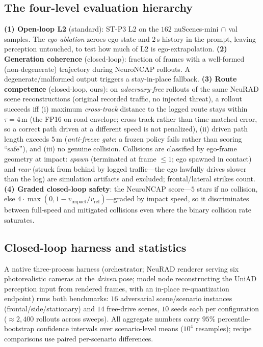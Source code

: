 \documentclass[conference]{IEEEtran}
\begin{document}
\subsection{The four-level evaluation hierarchy}
\label{sec:hierarchy-def}
\textbf{(1) Open-loop L2} (standard): ST-P3 L2 on the $162$ nuScenes-mini$\,\cap\,$val
samples. The \emph{ego-ablation} zeroes ego-state and $2$\,s history in the prompt, leaving
perception untouched, to test how much of L2 is ego-extrapolation.
\textbf{(2) Generation coherence} (closed-loop): fraction of frames with a well-formed
(non-degenerate) trajectory during NeuroNCAP rollouts. A degenerate/malformed output triggers
a stay-in-place fallback.
\textbf{(3) Route competence} (closed-loop, ours): on \emph{adversary-free} rollouts of the
same NeuRAD scene reconstructions (original recorded traffic, no injected threat), a rollout
succeeds iff (i) maximum \emph{cross-track} distance to the logged route stays within
$\tau{=}4$\,m (the FP16 on-road envelope; cross-track rather than time-matched error, so a
correct path driven at a different speed is not penalized), (ii) driven path length exceeds
$5$\,m (\emph{anti-freeze gate}: a frozen policy fails rather than scoring ``safe''), and
(iii) no genuine collision. Collisions are classified by ego-frame geometry at impact:
\emph{spawn} (terminated at frame $\le1$; ego spawned in contact) and \emph{rear} (struck
from behind by logged traffic---the ego lawfully drives slower than the log) are simulation
artifacts and excluded; frontal/lateral strikes count.
\textbf{(4) Graded closed-loop safety}: the NeuroNCAP score---$5$ stars if no collision, else
$4\!\cdot\!\max(0,1-v_\text{impact}/v_\text{ref})$---graded by impact speed, so it
discriminates between full-speed and mitigated collisions even where the binary collision
rate saturates.

\subsection{Closed-loop harness and statistics}
A native three-process harness (orchestrator; NeuRAD renderer serving six photorealistic
cameras at the \emph{driven} pose; model node reconstructing the UniAD perception input from
rendered frames, with an in-place re-quantization endpoint) runs both benchmarks:
$16$ adversarial scene/scenario instances (frontal/side/stationary) and $14$ free-drive
scenes, $10$ seeds each per configuration ($\approx2{,}400$ rollouts across sweeps).
All aggregate numbers carry $95\%$ percentile-bootstrap confidence intervals over
scenario-level means ($10^4$ resamples); recipe comparisons use paired per-scenario
differences.
\end{document}
